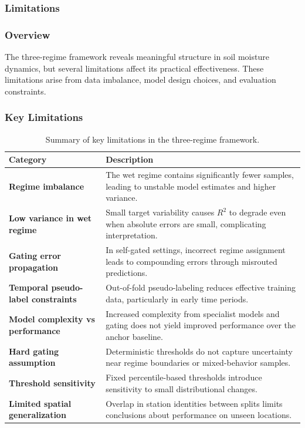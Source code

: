 \subsubsection*{Limitations}

\subsubsection*{Overview}

The three-regime framework reveals meaningful structure in soil moisture dynamics, but several limitations affect its practical effectiveness. These limitations arise from data imbalance, model design choices, and evaluation constraints.

\subsubsection*{Key Limitations}

\begin{table}[H]
\centering
\begin{tabular}{p{4cm} p{9cm}}
\toprule
\textbf{Category} & \textbf{Description} \\
\midrule
\textbf{Regime imbalance} & The wet regime contains significantly fewer samples, leading to unstable model estimates and higher variance. \\

\textbf{Low variance in wet regime} & Small target variability causes $R^2$ to degrade even when absolute errors are small, complicating interpretation. \\

\textbf{Gating error propagation} & In self-gated settings, incorrect regime assignment leads to compounding errors through misrouted predictions. \\

\textbf{Temporal pseudo-label constraints} & Out-of-fold pseudo-labeling reduces effective training data, particularly in early time periods. \\

\textbf{Model complexity vs performance} & Increased complexity from specialist models and gating does not yield improved performance over the anchor baseline. \\

\textbf{Hard gating assumption} & Deterministic thresholds do not capture uncertainty near regime boundaries or mixed-behavior samples. \\

\textbf{Threshold sensitivity} & Fixed percentile-based thresholds introduce sensitivity to small distributional changes. \\

\textbf{Limited spatial generalization} & Overlap in station identities between splits limits conclusions about performance on unseen locations. \\
\bottomrule
\end{tabular}
\caption{Summary of key limitations in the three-regime framework.}
\end{table}

